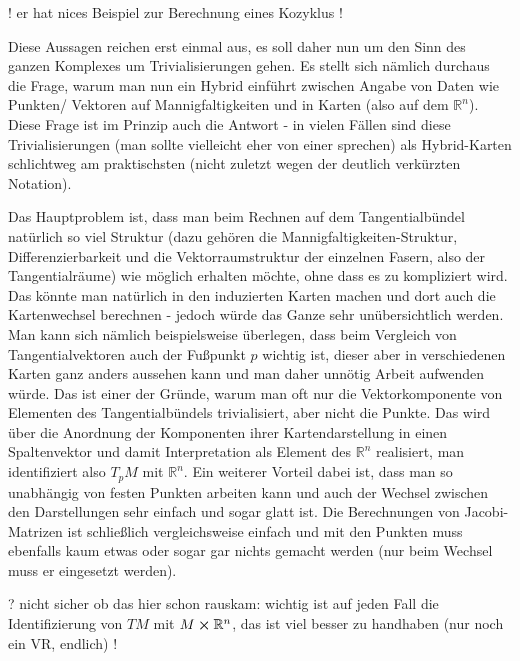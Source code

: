 \documentclass[../H_Analysis_main.tex]{subfiles}
\begin{document}
! er hat nices Beispiel zur Berechnung eines Kozyklus !


Diese Aussagen reichen erst einmal aus, es soll daher nun um den Sinn des ganzen Komplexes um Trivialisierungen gehen. Es stellt sich nämlich durchaus die Frage, warum man nun ein Hybrid einführt zwischen Angabe von Daten wie Punkten/ Vektoren auf Mannigfaltigkeiten und in Karten (also auf dem $\mathbb{R}^n$). Diese Frage ist im Prinzip auch die Antwort - in vielen Fällen sind diese Trivialisierungen (man sollte vielleicht eher von einer  sprechen) als Hybrid-Karten schlichtweg am praktischsten (nicht zuletzt wegen der deutlich verkürzten Notation).

Das Hauptproblem ist, dass man beim Rechnen auf dem Tangentialbündel natürlich so viel Struktur (dazu gehören die Mannigfaltigkeiten-Struktur, Differenzierbarkeit und die Vektorraumstruktur der einzelnen Fasern, also der Tangentialräume) wie möglich erhalten möchte, ohne dass es zu kompliziert wird. Das könnte man natürlich in den induzierten Karten machen und dort auch die Kartenwechsel berechnen - jedoch würde das Ganze sehr unübersichtlich werden. Man kann sich nämlich beispielsweise überlegen, dass beim Vergleich von Tangentialvektoren auch der Fußpunkt $p$ wichtig ist, dieser aber in verschiedenen Karten ganz anders aussehen kann und man daher unnötig Arbeit aufwenden würde. Das ist einer der Gründe, warum man oft nur die Vektorkomponente von Elementen des Tangentialbündels trivialisiert, aber nicht die Punkte. Das wird über die Anordnung der Komponenten ihrer Kartendarstellung in einen Spaltenvektor und damit Interpretation als Element des $\mathbb{R}^n$ realisiert, man identifiziert also $T_p M$ mit $\mathbb{R}^n$. Ein weiterer Vorteil dabei ist, dass man so unabhängig von festen Punkten arbeiten kann und auch der Wechsel zwischen den Darstellungen sehr einfach und sogar glatt ist. Die Berechnungen von Jacobi-Matrizen ist schließlich vergleichsweise einfach und mit den Punkten muss ebenfalls kaum etwas oder sogar gar nichts gemacht werden (nur beim Wechsel muss er eingesetzt werden).


? nicht sicher ob das hier schon rauskam: wichtig ist auf jeden Fall die Identifizierung von $TM$ mit $M \cross \mathbb{R}^n$, das ist viel besser zu handhaben (nur noch ein VR, endlich) !


\end{document}

